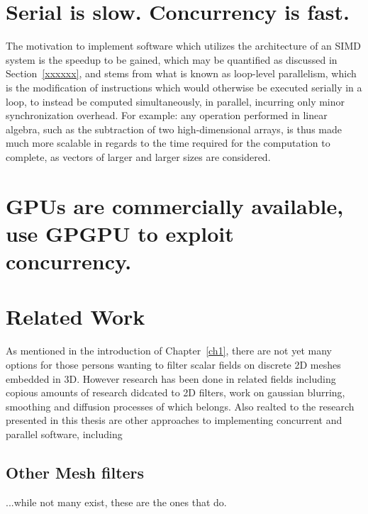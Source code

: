\section{Serial is slow. Concurrency is fast.}
The motivation to implement software which utilizes the architecture of an SIMD system is the speedup to be gained, which may be quantified as discussed in Section~\ref{xxxxxx}, and stems from what is known as loop-level parallelism, which is the modification of instructions which would otherwise be executed serially in a loop, to instead be computed simultaneously, in parallel, incurring only minor synchronization overhead. For example: any operation performed in linear algebra, such as the subtraction of two high-dimensional arrays, is thus made much more scalable in regards to the time required for the computation to complete, as vectors of larger and larger sizes are considered.

%
\section{GPUs are commercially available, use GPGPU to exploit concurrency.}

%
%
%
%
%
%
\section{Related Work}
As mentioned in the introduction of Chapter~\ref{ch1}, there are not yet many options for those persons wanting to filter scalar fields on discrete 2D meshes embedded in 3D. However research has been done in related fields including copious amounts of research didcated to 2D filters, work on gaussian blurring, smoothing and diffusion processes of which  belongs. Also realted to the research presented in this thesis are other approaches to implementing concurrent and parallel software, including

%
%
%
%
\subsection{Other Mesh filters}
...while not many exist, these are the ones that do.

